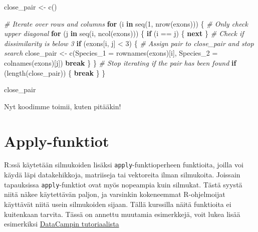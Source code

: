 \documentclass[
]{book}
\newenvironment{Shaded}{\begin{snugshade}}{\end{snugshade}}
\newcommand{\AttributeTok}[1]{\textcolor[rgb]{0.77,0.63,0.00}{#1}}
\newcommand{\CommentTok}[1]{\textcolor[rgb]{0.56,0.35,0.01}{\textit{#1}}}
\newcommand{\ControlFlowTok}[1]{\textcolor[rgb]{0.13,0.29,0.53}{\textbf{#1}}}
\newcommand{\DecValTok}[1]{\textcolor[rgb]{0.00,0.00,0.81}{#1}}
\newcommand{\FunctionTok}[1]{\textcolor[rgb]{0.00,0.00,0.00}{#1}}
\newcommand{\NormalTok}[1]{#1}
\newcommand{\OtherTok}[1]{\textcolor[rgb]{0.56,0.35,0.01}{#1}}
\newcommand{\SpecialCharTok}[1]{\textcolor[rgb]{0.00,0.00,0.00}{#1}}
\begin{document}
\begin{Shaded}
\begin{Highlighting}[]
\NormalTok{close\_pair }\OtherTok{\textless{}{-}} \FunctionTok{c}\NormalTok{()}

\CommentTok{\# Iterate over rows and columns}
\ControlFlowTok{for}\NormalTok{ (i }\ControlFlowTok{in} \FunctionTok{seq}\NormalTok{(}\DecValTok{1}\NormalTok{, }\FunctionTok{nrow}\NormalTok{(exons))) \{}
  \CommentTok{\# Only check upper diagonal}
  \ControlFlowTok{for}\NormalTok{ (j }\ControlFlowTok{in} \FunctionTok{seq}\NormalTok{(i, }\FunctionTok{ncol}\NormalTok{(exons))) \{}
    \ControlFlowTok{if}\NormalTok{ (i }\SpecialCharTok{==}\NormalTok{ j) \{}
       \ControlFlowTok{next}
\NormalTok{    \}}
    \CommentTok{\# Check if dissimilarity is below 3}
    \ControlFlowTok{if}\NormalTok{ (exons[i, j] }\SpecialCharTok{\textless{}} \DecValTok{3}\NormalTok{) \{}
      \CommentTok{\# Assign pair to close\_pair and stop search}
\NormalTok{      close\_pair }\OtherTok{\textless{}{-}} \FunctionTok{c}\NormalTok{(}\AttributeTok{Species\_1 =} \FunctionTok{rownames}\NormalTok{(exons)[i],}
                            \AttributeTok{Species\_2 =} \FunctionTok{colnames}\NormalTok{(exons)[j])}
      \ControlFlowTok{break}
\NormalTok{    \}}
\NormalTok{  \}}
  \CommentTok{\# Stop iterating if the pair has been found}
  \ControlFlowTok{if}\NormalTok{ (}\FunctionTok{length}\NormalTok{(close\_pair)) \{}
    \ControlFlowTok{break}
\NormalTok{  \}}
\NormalTok{\}}

\NormalTok{close\_pair}
\end{Highlighting}
\end{Shaded}

Nyt koodimme toimii, kuten pitääkin!

\hypertarget{apply-funktiot}{%
\section{Apply-funktiot}\label{apply-funktiot}}

R:ssä käytetään silmukoiden lisäksi \texttt{apply}-funktioperheen funktioita, joilla voi käydä läpi datakehikkoja, matriiseja tai vektoreita ilman silmukoita. Joissain tapauksissa \texttt{apply}-funktiot ovat myös nopeampia kuin silmukat. Tästä syystä niitä näkee käytettävän paljon, ja varsinkin kokeneemmat R-ohjelmoijat käyttävät niitä usein silmukoiden sijaan. Tällä kurssilla näitä funktioita ei kuitenkaan tarvita. Tässä on annettu muutamia esimerkkejä, voit lukea lisää esimerkiksi \href{https://www.datacamp.com/community/tutorials/r-tutorial-apply-family}{DataCampin tutoriaalista}
\end{document}
